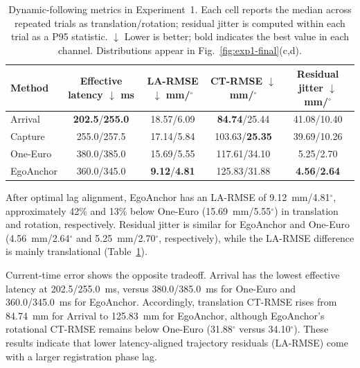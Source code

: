 \documentclass[review]{vgtc}
\begin{document}
\begin{table}[t]
\centering
\caption{Dynamic-following metrics in Experiment~1. Each cell reports the median across repeated trials as translation/rotation; residual jitter is computed within each trial as a P95 statistic. $\downarrow$ Lower is better; bold indicates the best value in each channel. Distributions appear in Fig.~\ref{fig:exp1-final}(c,d).}
\label{tab:exp1-dynamic}
\setlength{\tabcolsep}{2pt}
\begin{tabular}{@{}lcccc@{}}
\toprule
Method & \makecell{Effective\\latency $\downarrow$\\ms} & \makecell{\\LA-RMSE $\downarrow$\\mm/$^\circ$} & \makecell{\\CT-RMSE $\downarrow$\\mm/$^\circ$} & \makecell{Residual\\jitter $\downarrow$\\mm/$^\circ$} \\
\midrule
Arrival   & \textbf{202.5}/\textbf{255.0} & 18.57/6.09 & \textbf{84.74}/25.44 & 41.08/10.40 \\
Capture   & 255.0/257.5 & 17.14/5.84 & 103.63/\textbf{25.35} & 39.69/10.26 \\
One-Euro  & 380.0/385.0 & 15.69/5.55 & 117.61/34.10 & 5.25/2.70 \\
EgoAnchor & 360.0/345.0 & \textbf{9.12}/\textbf{4.81} & 125.83/31.88 & \textbf{4.56}/\textbf{2.64} \\
\bottomrule
\end{tabular}
\end{table}

After optimal lag alignment, EgoAnchor has an LA-RMSE of 9.12~mm/4.81$^\circ$, approximately 42\% and 13\% below One-Euro (15.69~mm/5.55$^\circ$) in translation and rotation, respectively. Residual jitter is similar for EgoAnchor and One-Euro (4.56~mm/2.64$^\circ$ and 5.25~mm/2.70$^\circ$, respectively), while the LA-RMSE difference is mainly translational (Table~\ref{tab:exp1-dynamic}).

Current-time error shows the opposite tradeoff. Arrival has the lowest effective latency at 202.5/255.0~ms, versus 380.0/385.0~ms for One-Euro and 360.0/345.0~ms for EgoAnchor. Accordingly, translation CT-RMSE rises from 84.74~mm for Arrival to 125.83~mm for EgoAnchor, although EgoAnchor's rotational CT-RMSE remains below One-Euro (31.88$^\circ$ versus 34.10$^\circ$). These results indicate that lower latency-aligned trajectory residuals (LA-RMSE) come with a larger registration phase lag.
\end{document}
